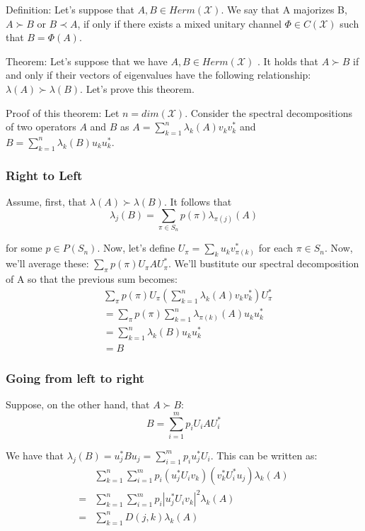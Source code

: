 \documentclass{article}
\begin{document}
    Definition: Let's suppose that $A,B\in Herm(\mathcal{X})$. We say that A
    majorizes B, $A \succ B$ or $B \prec A$, if only if there exists a mixed
    unitary channel $\Phi \in C(\mathcal{X})$ such that $B = \Phi(A)$.

    Theorem: Let's suppose that we have $ A,B \in Herm(\mathcal{X}) $ . It holds
    that $ A \succ B$ if and only if their vectors of eigenvalues have the
    following relationship: $\lambda(A) \succ \lambda(B)$. Let's prove this
    theorem.

    Proof of this theorem: Let $n = dim(\mathcal{X})$. Consider the spectral
    decompositions of two operators $A$ and $B$ as $A = \sum\limits_{k=1}^n
    \lambda_k(A)v_k v_k^*$ and $ B = \sum\limits_{k=1}^n \lambda_k(B)u_k u_k^*
    $. \subsubsection*{Right to Left}
    Assume, first, that $\lambda(A) \succ \lambda(B)$. It follows that
    \[ 
            \lambda_j(B) = \sum\limits_{\pi \in S_n} p(\pi) \lambda_{\pi(j)} (A) 
    \]


    for some $p \in P(S_n)$.
    Now, let's define $U_\pi = \sum\limits_k u_k v_{\pi(k)}^*$ for each $\pi \in
    S_n$. Now, we'll average these: $\sum\limits_\pi p(\pi) U_\pi A U_\pi^*$. We'll
    bustitute our spectral decomposition of A so that the previous sum becomes:
    \begin{align*}
        &\sum\limits_\pi p(\pi) U_\pi(\sum\limits_{k=1}^n \lambda_k(A) v_k v_k^*)
        U_\pi^* \\
        &=\sum_\pi p(\pi) \sum_{k=1}^n \lambda_{\pi(k)}(A)u_k u_k^* \\
        &= \sum_{k=1}^n \lambda_k(B) u_k u_k^* \\
        &= B
    \end{align*}
    
    \subsubsection*{Going from left to right}
    Suppose, on the other hand, that $A \succ B$:
    \[ 
            B = \sum_{i=1}^m p_i U_i A U_i^* 
    \]

    We have that $ \lambda_j(B) = u_j^* B u_j = \sum_{i=1}^m p_i u_j^* U_i$.
    This can be written as:
    \begin{align*}
        &\sum_{k=1}^n \sum_{i=1}^m p_i (u_j^* U_i v_k)(v_k^* U_i^* u_j)
        \lambda_k(A) \\
        =&\sum_{k=1}^n \sum_{i=1}^m p_i |u_j^* U_i v_k|^2 \lambda_k(A) \\
        =&\sum_{k=1}^n D(j,k) \lambda_k(A)
    \end{align*}
\end{document}
